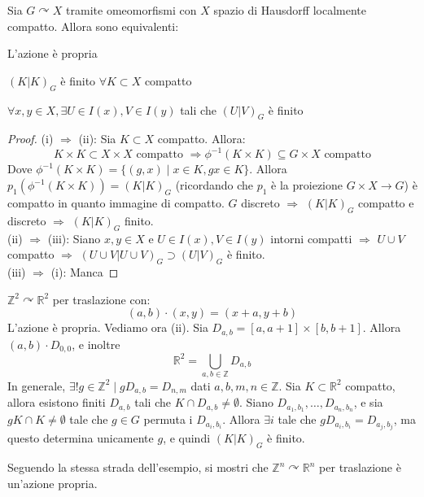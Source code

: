 \begin{thm}
Sia $G \curvearrowright X$ tramite omeomorfismi con $X$ spazio di Hausdorff localmente compatto. Allora sono equivalenti:
\begin{nlist}
\item L'azione è propria
\item $(K|K)_G$ è finito $\forall K \subset X$ compatto
\item $\forall x,y \in X, \exists U \in I(x), V \in I(y)$ tali che $(U|V)_G$ è finito
\end{nlist}
\end{thm}
\begin{proof}
(i) $\Longrightarrow$ (ii): Sia $K \subset X$ compatto. Allora:
$$K \times K \subset X \times X \text{ compatto } \Longrightarrow \phi ^{-1} (K \times K) \subseteq G \times X \text{ compatto}$$
Dove $\phi ^{-1}(K \times K)=\{(g,x) \mid x \in K, gx \in K\}$. Allora $p_1(\phi ^{-1}(K \times K))=(K|K)_G$ (ricordando che $p_1$ è la proiezione $G\times X \longrightarrow G$) è compatto in quanto immagine di compatto. $G$ discreto $\Longrightarrow$ $(K|K)_G$ compatto e discreto $\Longrightarrow$ $(K|K)_G$ finito.\\
(ii) $\Longrightarrow$ (iii): Siano $x,y \in X$ e $U \in I(x), V \in I(y)$ intorni compatti $\Longrightarrow$ $U \cup V$ compatto $\Longrightarrow$ $(U \cup V | U \cup V)_G \supset (U|V)_G$ è finito.\\
(iii) $\Longrightarrow$ (i): Manca
\end{proof}

\begin{ex}
$\mathbb{Z}^2 \curvearrowright \mathbb{R}^2$ per traslazione con:
$$(a,b) \cdot (x,y)=(x+a,y+b)$$
L'azione è propria. Vediamo ora (ii). Sia $D_{a,b}=[a,a+1] \times [b,b+1]$. Allora $(a,b) \cdot D_{0,0}$, e inoltre
$$\mathbb{R}^2=\bigcup _{a,b \in \mathbb{Z}} D_{a,b}$$
In generale, $\exists ! g \in \mathbb{Z}^2 \mid gD_{a,b}=D_{n,m}$ dati $a,b,m,n \in \mathbb{Z}$. Sia $K \subset \mathbb{R}^2$ compatto, allora esistono finiti $D_{a,b}$ tali che $K \cap D_{a,b} \neq \emptyset$. Siano $D_{a_1,b_1}, \dots ,D_{a_n,b_n}$, e sia $gK \cap K \neq \emptyset$ tale che $g \in G$ permuta i $D_{a_i,b_i}$. Allora $\exists i$ tale che $gD_{a_i,b_i}=D_{a_j,b_j}$, ma questo determina unicamente $g$, e quindi $(K|K)_G$ è finito.
\end{ex}

\begin{exc}
  Seguendo la stessa strada dell'esempio, si mostri che $\mathbb{Z}^n \curvearrowright \mathbb{R}^n$ per traslazione è un'azione propria.
\end{exc}

